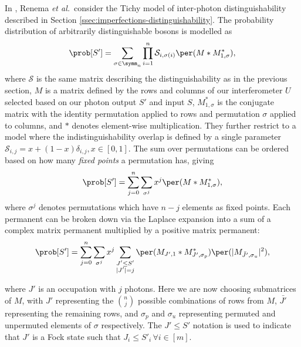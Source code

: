In \cite{renema2018, renema2018loss}, Renema \textit{et al.}\ consider the Tichy model of inter-photon distinguishability described in Section \ref{ssec:imperfections-distinguishability}. 
The probability distribution of arbitrarily distinguishable bosons is modelled as
\begin{equation}
\prob[S'] = \sum_{\sigma\in\symm_n}\prod_{i=1}^n\mathcal{S}_{i,\sigma(i)}\per(M*M^*_{1,\sigma}) ,
\end{equation}
where $\mathcal{S}$ is the same matrix describing the distinguishability as in the previous section, $M$ is a matrix defined by the rows and columns of our interferometer $U$ selected based on our photon output $S'$ and input $S$, $M^*_{1,\sigma}$ is the conjugate matrix with the identity permutation applied to rows and permutation $\sigma$ applied to columns, and $*$ denotes element-wise multiplication. 
They further restrict to a model where the indistinguishability overlap is defined by a single parameter $\mathcal{S}_{i,j} = x + (1-x)\delta_{i,j}, x \in [0,1]$.
The sum over permutations can be ordered based on how many \emph{fixed points} a permutation has, giving
\begin{equation}
\prob[S'] = \sum_{j=0}^n\sum_{\sigma^j}x^j\per(M*M^*_{1,\sigma}) , \label{eqn:renema-state}
\end{equation}
where $\sigma^j$ denotes permutations which have $n-j$ elements as fixed points.
Each permanent can be broken down via the Laplace expansion into a sum of a complex matrix permanent multiplied by a positive matrix permanent:
\begin{equation}
\prob[S'] = \sum_{j=0}^n\sum_{\sigma^j}x^j\sum_{\substack{J'\leq S'\\|J'|=j}}\per(M_{J',1}*M^*_{J',\sigma_p})\per(|M_{\bar{J'},\sigma_u}|^2) ,
\end{equation}

\noindent where $J'$ is an occupation with $j$ photons. Here we are now choosing submatrices of $M$, with $J'$ representing the $\binom{n}{j}$ possible combinations of rows from $M$, $\bar{J'}$ representing the remaining rows, and $\sigma_p$ and $\sigma_u$  representing permuted and unpermuted elements of $\sigma$ respectively.
The $J' \leq S'$ notation is used to indicate that $J'$ is a Fock state such that $J_i\leq S'_i \,\forall i\in[m]$.

